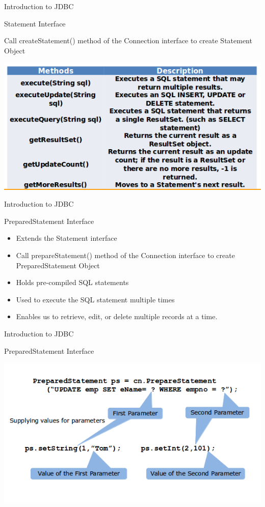 \documentclass[14pt]{beamer}
\begin{document}
\begin{frame}[fragile]{Introduction to JDBC}
\begin{block}{}
Statement Interface
\end{block}
Call createStatement() method of the Connection interface to create Statement Object
\begin{center}
    \includegraphics[scale=0.5]{JEE-M03-S01-Image9.png}
  \end{center}
\end{frame}

\begin{frame}[fragile]{Introduction to JDBC}
\begin{block}{}
PreparedStatement Interface
\end{block}
\begin{itemize}
\item Extends the Statement interface
\item Call prepareStatement() method of the Connection interface to create PreparedStatement Object
\item Holds pre-compiled SQL statements
\item Used to execute the SQL statement multiple times
\item Enables us to retrieve, edit, or delete multiple records at a time.
\end{itemize}
\end{frame}

\begin{frame}[fragile]{Introduction to JDBC}
\begin{block}{}
PreparedStatement Interface
\end{block}
\begin{center}
    \includegraphics[scale=0.5]{JEE-M03-S01-Image10.png}
  \end{center}
\end{frame}
\end{document}
